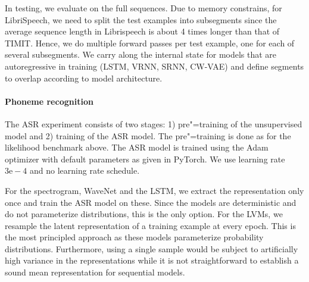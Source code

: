{In testing, we evaluate on the full sequences. Due to memory constrains, for LibriSpeech, we need to split the test examples into subsegments since the average sequence length in Librispeech is about 4 times longer than that of TIMIT. Hence, we do multiple forward passes per test example, one for each of several subsegments. We carry along the internal state for models that are autoregressive in training (LSTM, VRNN, SRNN, CW-VAE) and define segments to overlap according to model architecture.

\paragraph{Phoneme recognition}
The ASR experiment consists of two stages: 1) pre"=training of the unsupervised model and 2) training of the ASR model. The pre"=training is done as for the likelihood benchmark above. The ASR model is trained using the Adam optimizer \parencite{kingma_adam_2015} with default parameters as given in PyTorch. We use learning rate $3\text{e}-4$ and no learning rate schedule. 

For the spectrogram, WaveNet and the LSTM, we extract the representation only once and train the ASR model on these. Since the models are deterministic and do not parameterize distributions, this is the only option. For the LVMs, we resample the latent representation of a training example at every epoch. This is the most principled approach as these models parameterize probability distributions. Furthermore, using a single sample would be subject to artificially high variance in the representations while it is not straightforward to establish a sound mean representation for sequential models.




}
